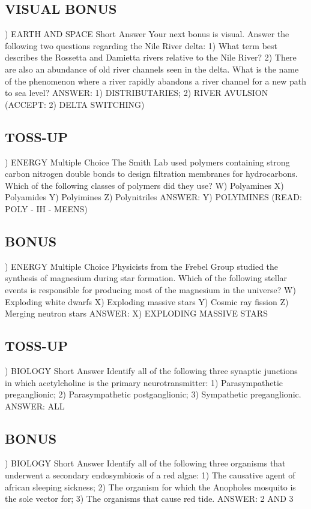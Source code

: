 \documentclass{article}
\begin{document}
\subsection*{VISUAL BONUS}
) EARTH AND SPACE Short Answer Your next bonus is visual. Answer the following two questions regarding the Nile River delta: 1) What term best describes the Rossetta and Damietta rivers relative to the Nile River? 2) There are also an abundance of old river channels seen in the delta. What is the name of the phenomenon where a river rapidly abandons a river channel for a new path to sea level?
\noindent ANSWER: 1) DISTRIBUTARIES; 2) RIVER AVULSION (ACCEPT: 2) DELTA SWITCHING)

\subsection*{TOSS-UP}
) ENERGY Multiple Choice The Smith Lab used polymers containing strong carbon nitrogen double bonds to design filtration membranes for hydrocarbons. Which of the following classes of polymers did they use?
\noindent W) Polyamines
\noindent X) Polyamides
\noindent Y) Polyimines
\noindent Z) Polynitriles
\noindent ANSWER: Y) POLYIMINES (READ: POLY - IH - MEENS)

\subsection*{BONUS}
) ENERGY Multiple Choice Physicists from the Frebel Group studied the synthesis of magnesium during star formation. Which of the following stellar events is responsible for producing most of the magnesium in the universe?
\noindent W) Exploding white dwarfs
\noindent X) Exploding massive stars
\noindent Y) Cosmic ray fission
\noindent Z) Merging neutron stars
\noindent ANSWER: X) EXPLODING MASSIVE STARS

\subsection*{TOSS-UP}
) BIOLOGY Short Answer Identify all of the following three synaptic junctions in which acetylcholine is the primary neurotransmitter: 1) Parasympathetic preganglionic; 2) Parasympathetic postganglionic; 3) Sympathetic preganglionic.
\noindent ANSWER: ALL

\subsection*{BONUS}
) BIOLOGY Short Answer Identify all of the following three organisms that underwent a secondary endosymbiosis of a red algae: 1) The causative agent of african sleeping sickness; 2) The organism for which the Anopholes mosquito is the sole vector for; 3) The organisms that cause red tide.
\noindent ANSWER: 2 AND 3
\end{document}
